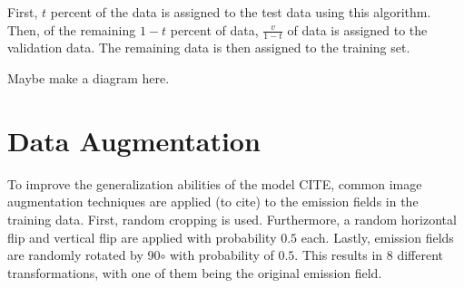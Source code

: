First, $t$ percent of the data is assigned to the test data using this algorithm.
Then, of the remaining $1 - t$ percent of data, $\frac{v}{1 - t}$ of data is assigned to the validation data.
The remaining data is then assigned to the training set.

Maybe make a diagram here.

\section{Data Augmentation}
To improve the generalization abilities of the model CITE, common image augmentation techniques are applied (to cite) to the emission fields in the training data.
First, random cropping is used.
Furthermore, a random horizontal flip and vertical flip are applied with probability $0.5$ each.
Lastly, emission fields are randomly rotated by 90$\circ$ with probability of $0.5$.
This results in $8$ different transformations, with one of them being the original emission field.
